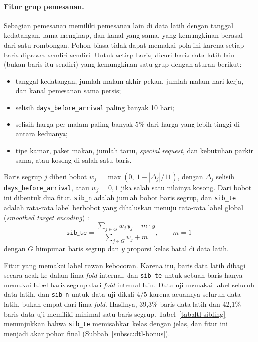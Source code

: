 \paragraph{Fitur grup pemesanan.} Sebagian pemesanan memiliki pemesanan lain di data latih dengan
tanggal kedatangan, lama menginap, dan kanal yang sama, yang kemungkinan berasal dari satu rombongan.
Pohon biasa tidak dapat memakai pola ini karena setiap baris diproses sendiri-sendiri. Untuk setiap
baris, dicari baris data latih lain (bukan baris itu sendiri) yang kemungkinan satu grup dengan aturan
berikut:
\begin{itemize}
	\item tanggal kedatangan, jumlah malam akhir pekan, jumlah malam hari kerja, dan kanal pemesanan
	sama persis;
	\item selisih \texttt{days\_before\_arrival} paling banyak 10 hari;
	\item selisih harga per malam paling banyak 5\% dari harga yang lebih tinggi di antara keduanya;
	\item tipe kamar, paket makan, jumlah tamu, \textit{special request}, dan kebutuhan parkir sama,
	atau kosong di salah satu baris.
\end{itemize}
Baris segrup $j$ diberi bobot $w_j = \max(0,\ 1 - |\Delta_j| / 11)$, dengan $\Delta_j$ selisih
\texttt{days\_before\_arrival}, atau $w_j = 0{,}1$ jika salah satu nilainya kosong. Dari bobot ini
dibentuk dua fitur. \texttt{sib\_n} adalah jumlah bobot baris segrup, dan \texttt{sib\_te} adalah
rata-rata label berbobot yang dihaluskan menuju rata-rata label global (\textit{smoothed target
encoding}) \cite{micci2001targetenc}:
\begin{equation}
	\texttt{sib\_te} = \frac{\sum_{j \in G} w_j\, y_j + m \cdot \bar{y}}{\sum_{j \in G} w_j + m}, \qquad m = 1
	\label{eq:dtl-sibling}
\end{equation}
dengan $G$ himpunan baris segrup dan $\bar{y}$ proporsi kelas batal di data latih.

Fitur yang memakai label rawan kebocoran. Karena itu, baris data latih dibagi secara acak ke dalam
lima \textit{fold} internal, dan \texttt{sib\_te} untuk sebuah baris hanya memakai label baris segrup
dari \textit{fold} internal lain. Data uji memakai label seluruh data latih, dan \texttt{sib\_n} untuk
data uji dikali $4/5$ karena acuannya seluruh data latih, bukan empat dari lima \textit{fold}.
Hasilnya, 39,3\% baris data latih dan 42,1\% baris data uji memiliki minimal satu baris segrup.
Tabel~\ref{tab:dtl-sibling} menunjukkan bahwa \texttt{sib\_te} memisahkan kelas dengan jelas, dan
fitur ini menjadi akar pohon final (Subbab~\ref{subsec:dtl-bonus}).

